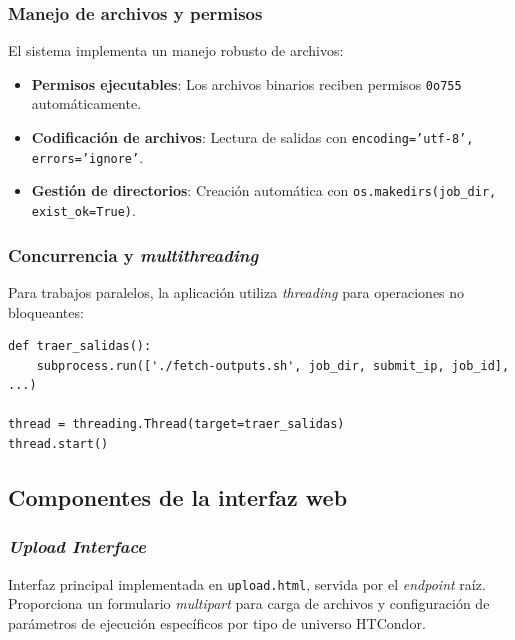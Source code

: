 \subsubsection{Manejo de archivos y permisos}
\noindent

El sistema implementa un manejo robusto de archivos:

\begin{itemize}
	\item \textbf{Permisos ejecutables}: Los archivos binarios reciben permisos \texttt{0o755} automáticamente.
	\item \textbf{Codificación de archivos}: Lectura de salidas con \texttt{encoding='utf-8', errors='ignore'}.
	\item \textbf{Gestión de directorios}: Creación automática con \texttt{os.makedirs(job\_dir, exist\_ok=True)}.
\end{itemize}

\subsubsection{Concurrencia y \textit{multithreading}}
\noindent

Para trabajos paralelos, la aplicación utiliza \textit{threading} para operaciones no bloqueantes:

\begin{verbatim}
def traer_salidas():
    subprocess.run(['./fetch-outputs.sh', job_dir, submit_ip, job_id], ...)

thread = threading.Thread(target=traer_salidas)
thread.start()
\end{verbatim}

\subsection{Componentes de la interfaz web}
\noindent

\subsubsection{\textit{Upload Interface}}
\noindent
Interfaz principal implementada en \texttt{upload.html}, servida por el \textit{endpoint} raíz. Proporciona un formulario \textit{multipart} para carga de archivos y configuración de parámetros de ejecución específicos por tipo de universo HTCondor.

